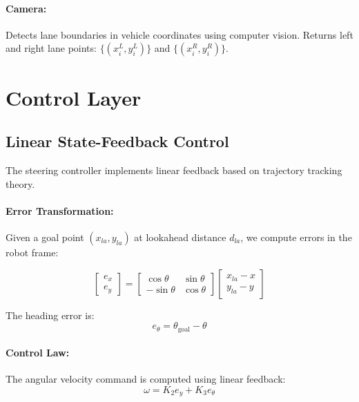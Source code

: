 \documentclass[11pt,a4paper]{article}
\begin{document}
\paragraph{Camera:}
Detects lane boundaries in vehicle coordinates using computer vision. Returns left and right lane points: $\{(x_i^L, y_i^L)\}$ and $\{(x_i^R, y_i^R)\}$.

\section{Control Layer}

\subsection{Linear State-Feedback Control}

The steering controller implements linear feedback based on trajectory tracking theory.

\paragraph{Error Transformation:}
Given a goal point $(x_{la}, y_{la})$ at lookahead distance $d_{la}$, we compute errors in the robot frame:

\begin{equation}
\begin{bmatrix} e_x \\ e_y \end{bmatrix} = 
\begin{bmatrix} \cos\theta & \sin\theta \\ -\sin\theta & \cos\theta \end{bmatrix}
\begin{bmatrix} x_{la} - x \\ y_{la} - y \end{bmatrix}
\end{equation}

The heading error is:
\begin{equation}
e_\theta = \theta_{\text{goal}} - \theta
\end{equation}

\paragraph{Control Law:}
The angular velocity command is computed using linear feedback:
\begin{equation}
\omega = K_2 e_y + K_3 e_\theta
\end{equation}
\end{document}
